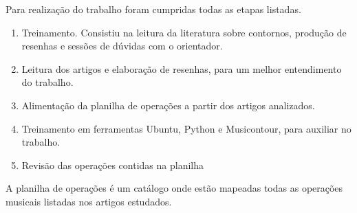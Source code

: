 \documentclass[11pt]{article}
\begin{document}
Para realização do trabalho foram cumpridas todas as etapas listadas.

\begin{enumerate}
\item Treinamento. Consistiu na leitura da literatura sobre contornos, produção
de resenhas e sessões de dúvidas com o orientador.
\item Leitura dos artigos e elaboração de resenhas, para um melhor entendimento 
do trabalho.
\item Alimentação da planilha de operações a partir dos artigos analizados.
\item Treinamento em ferramentas Ubuntu, Python e Musicontour, para auxiliar
no trabalho.
\item Revisão das operações contidas na planilha
\end{enumerate}





A planilha de operações é um catálogo onde estão mapeadas todas as operações musicais listadas
nos artigos estudados.
\end{document}
